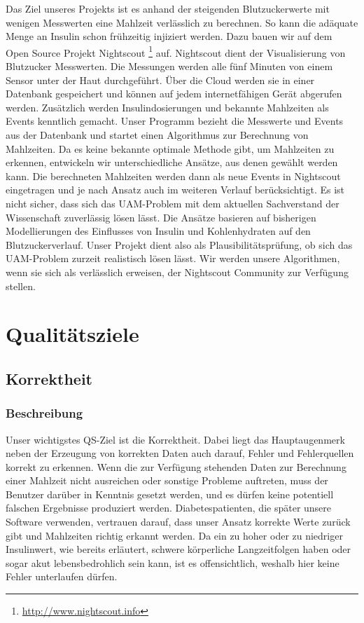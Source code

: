 \documentclass[accentcolor=tud0b,12pt,paper=a4]{tudreport}
\begin{document}
Das Ziel unseres Projekts ist es anhand der steigenden Blutzuckerwerte mit wenigen Messwerten eine Mahlzeit verlässlich zu berechnen. So kann die adäquate Menge an Insulin schon frühzeitig injiziert werden. Dazu bauen wir auf dem Open Source Projekt Nightscout \footnote{\url{http://www.nightscout.info}} auf. Nightscout dient der Visualisierung von Blutzucker Messwerten. Die Messungen werden alle fünf Minuten von einem Sensor unter der Haut durchgeführt. Über die Cloud werden sie in einer Datenbank gespeichert und können auf jedem internetfähigen Gerät abgerufen werden. Zusätzlich werden Insulindosierungen und bekannte Mahlzeiten als Events kenntlich gemacht. Unser Programm bezieht die Messwerte und Events aus der Datenbank und startet einen Algorithmus zur Berechnung von Mahlzeiten. Da es keine bekannte optimale Methode gibt, um Mahlzeiten zu erkennen, entwickeln wir unterschiedliche Ansätze, aus denen gewählt werden kann.  Die berechneten Mahlzeiten werden dann als neue Events in Nightscout eingetragen und je nach Ansatz auch im weiteren Verlauf berücksichtigt.
Es ist nicht sicher, dass sich das UAM-Problem mit dem aktuellen Sachverstand der Wissenschaft zuverlässig lösen lässt. Die Ansätze basieren auf bisherigen Modellierungen des Einflusses von Insulin und Kohlenhydraten auf den Blutzuckerverlauf. Unser Projekt dient also als Plausibilitätsprüfung, ob sich das UAM-Problem zurzeit realistisch lösen lässt.
Wir werden unsere Algorithmen, wenn sie sich als verlässlich erweisen, der Nightscout Community zur Verfügung stellen.


	\chapter{Qualitätsziele}
    \section{Korrektheit}
    
	\subsection{Beschreibung}
Unser wichtigstes QS-Ziel ist die Korrektheit. Dabei liegt das Hauptaugenmerk neben der Erzeugung von korrekten Daten auch darauf, Fehler und Fehlerquellen korrekt zu erkennen. Wenn die zur Verfügung stehenden Daten zur Berechnung einer Mahlzeit nicht ausreichen oder sonstige Probleme auftreten, muss der Benutzer darüber in Kenntnis gesetzt werden, und es dürfen keine potentiell falschen Ergebnisse produziert werden. Diabetespatienten, die später unsere Software verwenden, vertrauen darauf, dass unser Ansatz korrekte Werte zurück gibt und Mahlzeiten richtig erkannt werden. Da ein zu hoher oder zu niedriger Insulinwert, wie bereits erläutert, schwere körperliche Langzeitfolgen haben oder sogar akut lebensbedrohlich sein kann, ist es offensichtlich, weshalb hier keine Fehler unterlaufen dürfen.
\end{document}
